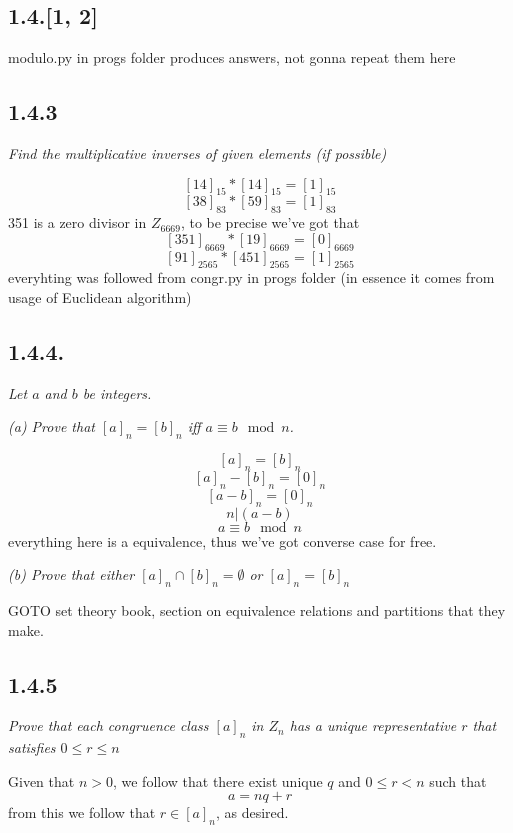 \documentclass[11pt,oneside,titlepage]{book}
\begin{document}
\subsection*{1.4.[1, 2]}

modulo.py in progs folder produces answers, not gonna repeat them here

\subsection*{1.4.3}

\textit{Find the multiplicative inverses of given elements (if possible)}

$$[14]_{15} * [14]_{15} = [1]_{15}$$
$$[38]_{83} * [59]_{83} = [1]_{83}$$
351 is a zero divisor in $Z_{6669}$, to be precise we've got that
$$[351]_{6669} * [19]_{6669} = [0]_{6669}$$
$$[91]_{2565} * [451]_{2565} =  [1]_{2565}$$
everyhting was followed from congr.py in progs folder (in essence it comes from
usage of Euclidean algorithm)

\subsection*{1.4.4.}

\textit{Let $a$ and $b$ be integers. }

\textit{(a) Prove that $[a]_n = [b]_n$ iff $a \equiv b \mod n$.}

$$[a]_n = [b]_n$$
$$[a]_n - [b]_n = [0]_n$$
$$[a - b]_n = [0]_n$$
$$n | (a - b)$$
$$a \equiv b \mod n$$
everything here is a equivalence, thus we've got converse case for free.

\textit{(b) Prove that either $[a]_n \cap [b]_n = \emptyset$ or $[a]_n = [b]_n$}

GOTO set theory book, section on equivalence relations and partitions that they make.


\subsection*{1.4.5}

\textit{Prove that each congruence class $[a]_n$ in $Z_n$ has a unique representative $r$
  that satisfies $0 \leq r \leq n$}

Given that $n > 0$, we follow that there exist unique $q$ and $0 \leq r < n$ such that
$$a = nq + r$$
from this we follow that $r \in [a]_n$, as desired. 
\end{document}
